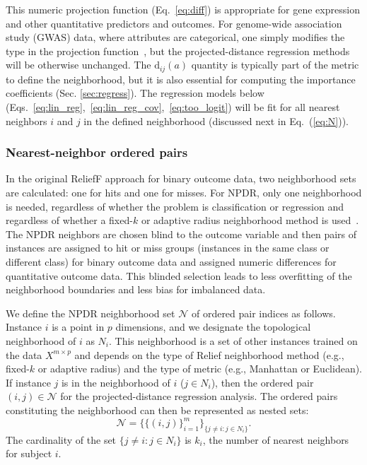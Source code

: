 \documentclass[10pt]{article}
\begin{document}
This numeric projection function (Eq.~\ref{eq:diff}) is appropriate for gene expression and other quantitative predictors and outcomes. For genome-wide association study (GWAS) data, where attributes are categorical, one simply modifies the type in the projection function~\cite{titv}, but the projected-distance regression methods will be otherwise unchanged. The $\text{d}_{ij}(a)$ quantity is typically part of the metric to define the neighborhood, but it is also essential for computing the importance coefficients (Sec. \ref{sec:regress}).  The regression models below (Eqs.~\ref{eq:lin_reg},~\ref{eq:lin_reg_cov},~\ref{eq:too_logit}) will be fit for all nearest neighbors $i$ and $j$ in the defined neighborhood (discussed next in Eq.~(\ref{eq:N})). 

\subsubsection{Nearest-neighbor ordered pairs}
In the original ReliefF approach for binary outcome data, two neighborhood sets are calculated: one for hits and one for misses.
For NPDR, only one neighborhood is needed, regardless of whether the problem is classification or regression and regardless of whether a fixed-$k$ or adaptive radius neighborhood method is used~\cite{greene09,urbanowicz17,mckinney13}. The NPDR neighbors are chosen blind to the outcome variable and then pairs of instances are assigned to hit or miss groups (instances in the same class or different class) for binary outcome data and assigned numeric differences for quantitative outcome data. This blinded selection leads to less overfitting of the neighborhood boundaries and less bias for imbalanced data.     

We define the NPDR neighborhood set $\mathcal{N}$ of ordered pair indices as follows. Instance $i$ is a point in $p$ dimensions, and we designate the topological neighborhood of $i$ as $N_{i}$. This neighborhood is a set of other instances trained on the data $X^{m \times p}$ and depends on the type of Relief neighborhood method (e.g., fixed-$k$ or adaptive radius) and the type of metric (e.g., Manhattan or Euclidean). If instance $j$ is in the neighborhood of $i$ ($j \in N_{i}$), then the ordered pair $(i,j) \in \mathcal{N}$ for the projected-distance regression analysis. The ordered pairs constituting the neighborhood can then be represented as nested sets:
\begin{equation}\label{eq:N}
\mathcal{N}=\{\{(i, j)\}_{i=1}^{m}\}_{\{j \ne i : j \in N_{i}\}}.
\end{equation}
The cardinality of the set $\{j \ne i : j \in N_{i}\}$ is $k_i$, the number of nearest neighbors for subject $i$. 
\end{document}
